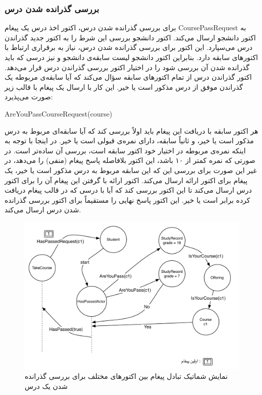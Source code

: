 \subsubsection{بررسی گذرانده شدن درس}
\label{subsection:passCourse}
  برای بررسی گذرانده شدن درس، اکتور اخذ درس یک پیغام CoursePassRequest به اکتور دانشجو ارسال می‌کند. اکتور دانشجو بررسی این شرط را به اکتور جدید گذراندن درس می‌سپارد. این اکتور برای بررسی گذرانده شدن درس، نیاز به برقراری ارتباط با اکتورهای سابقه دارد. بنابراین اکتور دانشجو لیست سابقه‌ی دانشجو و نیز درسی که باید گذرانده شدن آن بررسی شود را در اختیار اکتور بررسی گذراندن درس قرار می‌دهد. اکتور گذراندن درس از تمام اکتورهای سابقه سؤال می‌کند که آیا سابقه‌ی مربوطه یک گذراندن موفق از درس مذکور است یا خیر. این کار با ارسال یک پیغام با قالب زیر صورت می‌پذیرد:
  \begin{latin}
  AreYouPassCourseRequest(course)
  \end{latin}
هر اکتور سابقه‌ با دریافت این پیغام باید اولاً بررسی کند که آیا سابقه‌ای مربوط به درس مذکور است یا خیر، و ثانیاً سابقه، دارای نمره‌ی قبولی است یا خیر. در اینجا با توجه به اینکه نمره‌ی مربوطه در اختیار خود اکتور سابقه است، بررسی آن ساده‌تر است. در صورتی که نمره کمتر از ۱۰ باشد، این اکتور بلافاصله پاسخ پیغام (منفی) را می‌دهد، در غیر این صورت برای بررسی این که این سابقه مربوط به درس مذکور است یا خیر، یک پیغام برای اکتور ارائه ارسال می‌کند. اکتور ارائه با گرفتن این پیغام آن را برای اکتور درس ارسال می‌کند تا این اکتور بررسی کند که آیا با درسی که در قالب پیغام دریافت کرده برابر است یا خیر. این اکتور پاسخ نهایی را مستقیماً برای اکتور بررسی گذرانده شدن درس ارسال می‌کند.  
\begin{figure}[ht]
    \begin{center}
	\includegraphics[width=14cm]{4-ProposedFramework/Figures/HasPassed.pdf}
    \end{center}
    \caption{\label{fig:take_course_haspassed}نمایش شماتیک تبادل پیغام بین اکتورهای مختلف برای بررسی گذرانده شدن یک درس }
\end{figure}

